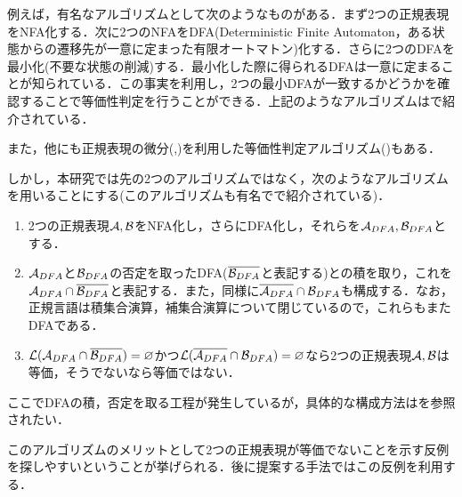 \documentclass[a4paper, 12pt, dvipdfmx, uplatex]{jsreport}
\begin{document}
例えば，有名なアルゴリズムとして次のようなものがある．まず2つの正規表現をNFA化する．次に2つのNFAをDFA(Deterministic Finite Automaton，ある状態からの遷移先が一意に定まった有限オートマトン)化する．さらに2つのDFAを最小化(不要な状態の削減)する．最小化した際に得られるDFAは一意に定まることが知られている．この事実を利用し，2つの最小DFAが一致するかどうかを確認することで等価性判定を行うことができる．上記のようなアルゴリズムは\cite{hopcroft}で紹介されている．

また，他にも正規表現の微分(\cite{regex_de1},\cite{regex_de2})を利用した等価性判定アルゴリズム(\cite{regex_eq_de})もある．

しかし，本研究では先の2つのアルゴリズムではなく，次のようなアルゴリズムを用いることにする(このアルゴリズムも有名で\cite{sipser}で紹介されている)．

\begin{enumerate}
  \item 2つの正規表現$\mathcal{A},\mathcal{B}$をNFA化し，さらにDFA化し，それらを$\mathcal{A}_{DFA},\mathcal{B}_{DFA}$とする．
  \item $\mathcal{A}_{DFA}$と$\mathcal{B}_{DFA}$の否定を取ったDFA($\overline{\mathcal{B}_{DFA}}$と表記する)との積を取り，これを$\mathcal{A}_{DFA}\cap\overline{\mathcal{B}_{DFA}}$と表記する．また，同様に$\overline{\mathcal{A}_{DFA}}\cap\mathcal{B}_{DFA}$も構成する．なお，正規言語は積集合演算，補集合演算について閉じているので，これらもまたDFAである．
  \item $\mathcal{L}(\mathcal{A}_{DFA}\cap\overline{\mathcal{B}_{DFA}})=\varnothing$かつ$\mathcal{L}(\overline{\mathcal{A}_{DFA}}\cap\mathcal{B}_{DFA})=\varnothing$なら2つの正規表現$\mathcal{A},\mathcal{B}$は等価，そうでないなら等価ではない．
\end{enumerate}

ここでDFAの積，否定を取る工程が発生しているが，具体的な構成方法は\cite{sipser}を参照されたい．

このアルゴリズムのメリットとして2つの正規表現が等価でないことを示す反例を探しやすいということが挙げられる．後に提案する手法ではこの反例を利用する．














\end{document}
